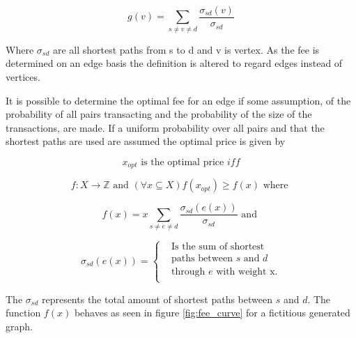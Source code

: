 \[ g(v) = \sum_{s \neq v \neq d}\frac{\sigma_{sd}(v)}{\sigma_{sd}} \]

Where $\sigma_{sd}$ are all shortest paths from s to d and v is vertex. As the fee is determined on an edge basis the definition is altered to regard edges instead of vertices. 

It is possible to determine the optimal fee for an edge if some assumption, of the probability of all pairs transacting and the probability of the size of the transactions, are made. If a uniform probability over all pairs and that the shortest paths are used are assumed the optimal price is given by

\[ x_{opt} \textrm{ is the optimal price } iff \]

\[ f: X \to \mathbb{Z} \textrm{ and } (\forall x \subseteq X)f(x_{opt}) \geqslant f(x) \textrm{ where }\]

\[ f(x) = x\sum_{s \neq e \neq d}\frac{\sigma_{sd}(e(x))}{\sigma_{sd}} \textrm{ and } \]


\[ \sigma_{sd}(e(x)) =  \begin{cases}
 & \text{Is the sum of shortest } \\
 & \text{paths between $s$ and $d$} \\
& \text{through $e$ with weight x.} \\

\end{cases} \]


The $\sigma_{sd}$ represents the total amount of shortest paths between $s$ and $d$.
The function $f(x)$ behaves as seen in figure \ref{fig:fee_curve} for a fictitious generated graph. 

